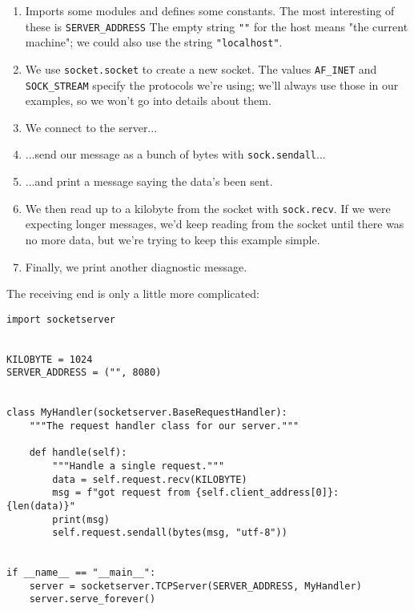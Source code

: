 \documentclass{scrbook}
\begin{document}
\begin{enumerate}

\item Imports some modules and defines some constants.
    The most interesting of these is \texttt{SERVER\_ADDRESS}
    The empty string \texttt{""} for the host means "the current machine";
    we could also use the string \texttt{"localhost"}.

\item We use \texttt{socket.socket} to create a new socket.
    The values \texttt{AF\_INET} and \texttt{SOCK\_STREAM} specify the protocols we're using;
    we'll always use those in our examples,
    so we won't go into details about them.

\item We connect to the server...

\item ...send our message as a bunch of bytes with \texttt{sock.sendall}...

\item ...and print a message saying the data's been sent.

\item We then read up to a kilobyte from the socket with \texttt{sock.recv}.
    If we were expecting longer messages,
    we'd keep reading from the socket until there was no more data,
    but we're trying to keep this example simple.

\item Finally, we print another diagnostic message.

\end{enumerate}


The receiving end is only a little more complicated:


\begin{lstlisting}[frame=single,frameround=tttt]
import socketserver


KILOBYTE = 1024
SERVER_ADDRESS = ("", 8080)


class MyHandler(socketserver.BaseRequestHandler):
    """The request handler class for our server."""

    def handle(self):
        """Handle a single request."""
        data = self.request.recv(KILOBYTE)
        msg = f"got request from {self.client_address[0]}: {len(data)}"
        print(msg)
        self.request.sendall(bytes(msg, "utf-8"))


if __name__ == "__main__":
    server = socketserver.TCPServer(SERVER_ADDRESS, MyHandler)
    server.serve_forever()
\end{lstlisting}
\end{document}
